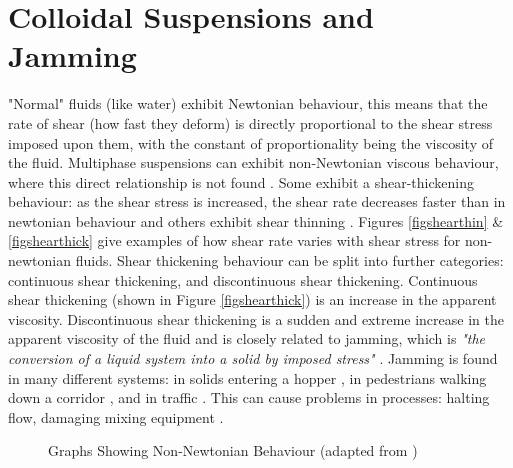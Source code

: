 \documentclass[a4]{report}
\begin{document}
	\section{Colloidal Suspensions and Jamming}
	"Normal" fluids (like water) exhibit Newtonian behaviour, this means that the rate of shear (how fast they deform) is directly proportional to the shear stress imposed upon them, with the constant of proportionality being the viscosity of the fluid\cite[p.~252]{schadict}. Multiphase suspensions can exhibit non-Newtonian viscous behaviour, where this direct relationship is not found \cite[p.~255-256]{schadict}. Some exhibit a shear-thickening behaviour: as the shear stress is increased, the shear rate decreases faster than in newtonian behaviour and others exhibit shear thinning \cite{backtypesofnonnewt}. Figures \ref{figshearthin} \& \ref{figshearthick} give examples of how shear rate varies with shear stress for non-newtonian fluids. Shear thickening behaviour can be split into further categories: continuous shear thickening, and discontinuous shear thickening. Continuous shear thickening (shown in Figure \ref{figshearthick})  is an increase in the apparent viscosity. Discontinuous shear thickening is a sudden and extreme increase in the apparent viscosity of the fluid and is closely related to jamming, which is \textit{"the conversion of a liquid system into a solid by imposed stress"} \cite{backhawjam}. Jamming is found in many different systems: in solids entering a hopper \cite{back2djam}, in pedestrians walking down a corridor \cite{backpedjam}, and in traffic \cite{backcarjam}. This can cause problems in processes: halting flow, damaging mixing equipment \cite{backshearjambertrand}. \newline %
	\begin{figure}[!h]
		\centering
		\label{figshearthinthick}
		\caption{Graphs Showing Non-Newtonian Behaviour (adapted from \cite{figshearthin, figshearthick})}
	\end{figure} \newline  \noindent
\end{document}
